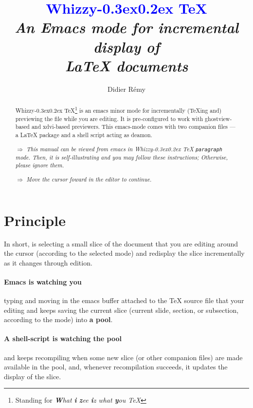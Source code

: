 \documentclass{article}
\def \whizzy{{Whizzy\kern -0.3ex\raise 0.2ex \hbox{\TeX}}}
\def \Whizzy{\textbf {\textcolor {blue}{\whizzy}}}
\def \instruction #1{\par\medskip \noindent$\Rightarrow$ {\em #1}}
\begin{document}
\pagestyle {empty}

\author {Didier R{\'e}my}

\title {
{\huge \Whizzy}
\\[1em]
{\em An {\bfseries Emacs mode} 
for incremental display of \\ 
{\bfseries {\LaTeX} documents}}
}

\maketitle   


\begin{abstract}
\def \B{\textbf}
{\whizzy}\footnote {Standing for {\em {\B W}hat {\B i} {\B z}ee
{\B i}z what {\B y}ou {\expandafter \B \TeX}}} is an emacs minor mode for
incrementally ({\TeX}ing and) previewing the file while you are editing.
%
It is pre-configured to work with ghostview-based and xdvi-based previewers.
This emacs-mode comes with two companion files ---a {\LaTeX} package and a
shell script acting as deamon. 

\instruction 
{This manual can be viewed from emacs in {\whizzy} {\tt paragraph}
mode. Then, it is self-illustrating and you may follow these instructions;
Otherwise, please ignore them.}

\instruction {Move the cursor foward in the editor to continue.}
\end{abstract}


\section {Principle} 

In short, {\sc \whizzy} is selecting a small slice of the document that 
you are editing around the cursor (according to the selected mode) 
and redisplay the slice incrementally as it changes through edition. 

\paragraph {Emacs is watching you} typing and moving in the 
emacs buffer attached to the {\TeX} source file that your editing and keeps
saving the current slice (current slide, section, or subsection, according
to the mode) into {\bf a pool}.

\paragraph {A shell-script is watching the pool}
and keeps recompiling when some new slice (or other companion files) 
are made available in the pool, and, whenever recompilation succeeds, it 
updates the display of the slice. 
\end{document}
